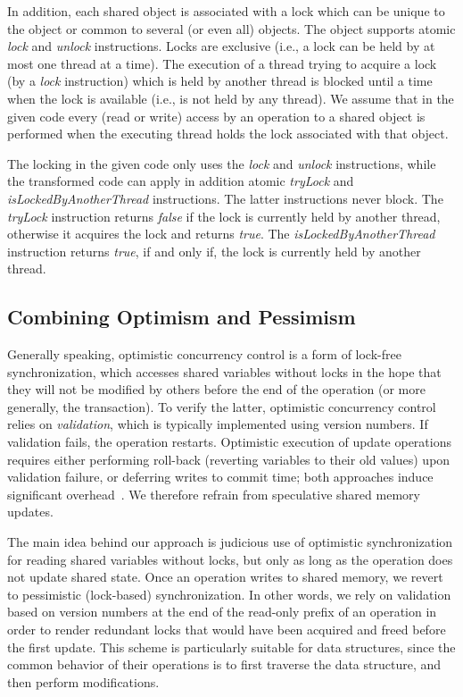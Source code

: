In addition, each shared object is associated with a lock which can be unique to the object or common to several (or even all) objects. 
The object supports atomic \emph{lock} and \emph{unlock} instructions.
Locks are exclusive (i.e., a lock can be held by at most one thread at a time).
The execution of a thread
trying to acquire a lock (by a \emph{lock} instruction) which is
held by another thread is blocked until a time when the
lock is available (i.e., is not held by any thread).
We assume that in the given code every (read
or write) access by an operation to a shared object is performed when the
executing thread holds the lock associated with that object.


The locking in the given code only uses the \emph{lock} and \emph{unlock} instructions, while the transformed code can apply in addition atomic
\emph{tryLock}  and \emph{isLockedByAnotherThread} instructions.
The latter instructions never block.
The \emph{tryLock} instruction returns \emph{false} if the lock is currently held by another thread, otherwise it acquires the lock and returns \emph{true}.
The \emph{isLockedByAnotherThread} instruction returns \emph{true}, if and only if, the lock is currently held by another thread.


\subsection{Combining Optimism and Pessimism}\label{ssec:overview}

Generally speaking, optimistic concurrency control is a form of lock-free synchronization, which accesses shared variables without locks in the hope that they will not be modified by others before the end of the operation (or more generally, the transaction). To verify the latter, optimistic concurrency control relies on \emph{validation}, which is typically implemented using version numbers. If validation fails, the operation restarts. Optimistic execution of update operations requires either performing roll-back (reverting variables to their old values) upon validation failure, or deferring writes to commit time; both approaches induce significant overhead~\cite{Cascaval:2008}. We therefore refrain from speculative shared memory updates.

The main idea behind our approach is judicious use of optimistic synchronization for reading
shared variables without locks, but only as long as the operation does not update shared state. Once an operation
writes to shared memory, we revert to pessimistic (lock-based) synchronization. In
other words, we rely on validation based on version numbers at the end of the read-only prefix of an operation in order to render redundant
locks that would have been acquired and freed before the first update.
This scheme is particularly suitable for data structures,
since the common behavior of their operations
is to first traverse the data structure, and then
perform modifications.

